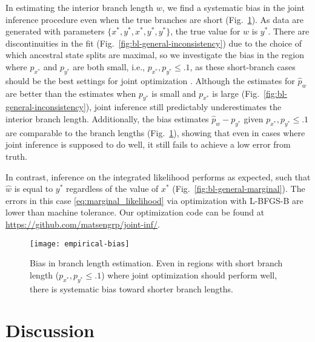 \documentclass[11pt]{article}
\begin{document}
In estimating the interior branch length $w$, we find a systematic bias in the joint inference procedure even when the true branches are short (Fig.~\ref{fig:empirical-bias}).
As data are generated with parameters $\{x^*, y^*, x^*, y^*, y^*\}$, the true value for $w$ is $y^*$.
There are discontinuities in the fit (Fig.~\ref{fig:bl-general-inconsistency}) due to the choice of which ancestral state splits are maximal, so we investigate the bias in the region where $p_{x^*}$ and $p_{y^*}$ are both small, i.e., $p_{x^*}, p_{y^*} \le .1$, as these short-branch cases should be the best settings for joint optimization \citep{Sagulenko2018-xl}.
Although the estimates for $\hat{p}_w$ are better than the estimates when $p_{y^*}$ is small and $p_{x^*}$ is large (Fig.~\ref{fig:bl-general-inconsistency}), joint inference still predictably underestimates the interior branch length.
Additionally, the bias estimates $\hat{p}_w-p_{y^*}$ given $p_{x^*}, p_{y^*} \le .1$ are comparable to the branch lengths (Fig.~\ref{fig:empirical-bias}), showing that even in cases where joint inference is supposed to do well, it still fails to achieve a low error from truth.

In contrast, inference on the integrated likelihood performs as expected, such that $\hat{w}$ is equal to $y^*$ regardless of the value of $x^*$ (Fig.~\ref{fig:bl-general-marginal}).
The errors in this case \eqref{eq:marginal_likelihood} via optimization with L-BFGS-B are lower than machine tolerance.
Our optimization code can be found at \url{https://github.com/matsengrp/joint-inf/}.


\begin{figure}
\centering
\texttt{[image: empirical-bias]}
\caption{
Bias in branch length estimation.
Even in regions with short branch length ($p_{x^*}, p_{y^*} \le .1$) where joint optimization should perform well, there is systematic bias toward shorter branch lengths.
}
\label{fig:empirical-bias}
\end{figure}

\section*{Discussion}
\end{document}
